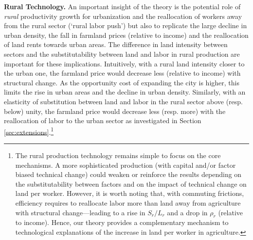 \documentclass[20250130-paper.tex]{subfiles}
\begin{document}
\textbf{Rural Technology.} An important insight of the theory is the potential role of \textit{rural} productivity growth for urbanization and the reallocation of workers away from the rural sector (`rural labor push') but also to replicate the large decline in urban density, the fall in farmland prices (relative to income) and the reallocation of land rents towards urban areas. The difference in land intensity between sectors and the substitutability between land and labor in rural production are important for these implications. Intuitively, with a rural land intensity closer to the urban one, the farmland price would decrease less (relative to income) with structural change. As the opportunity cost of expanding the city is higher, this limits the rise in urban areas and the decline in urban density. Similarly, with an elasticity of substitution between land and labor in the rural sector above (resp. below) unity, the farmland price would decrease less (resp. more) with the reallocation of labor to the urban sector as investigated in Section \ref{sec:extensions}.\footnote{The rural production technology remains simple to focus on the core mechanisms. A more sophisticated production (with capital and/or factor biased technical change) could weaken or reinforce the results depending on the substitutability between factors and on the impact of technical change on land per worker. However, it is worth noting that, with commuting frictions, efficiency requires to reallocate labor more than land away from agriculture with structural change---leading to a rise in $S_r/L_r$ and a drop in $\rho_r$ (relative to income). Hence, our theory provides a complementary mechanism to technological explanations of the increase in land per worker in agriculture.}
\end{document}
